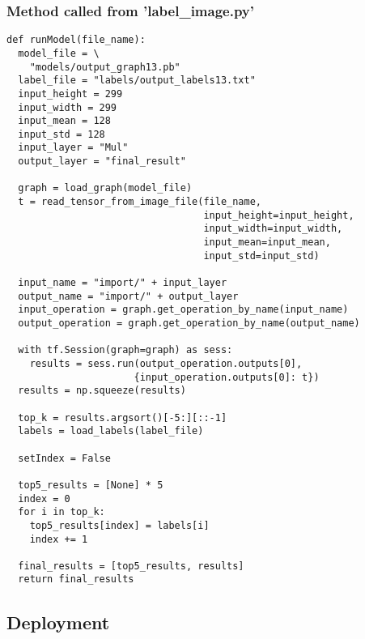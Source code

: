 \subsubsection*{Method called from 'label\_image.py'}
\begin{lstlisting}[style=Python]
def runModel(file_name):
  model_file = \
    "models/output_graph13.pb"
  label_file = "labels/output_labels13.txt"
  input_height = 299
  input_width = 299
  input_mean = 128
  input_std = 128
  input_layer = "Mul"
  output_layer = "final_result"

  graph = load_graph(model_file)
  t = read_tensor_from_image_file(file_name,
                                  input_height=input_height,
                                  input_width=input_width,
                                  input_mean=input_mean,
                                  input_std=input_std)

  input_name = "import/" + input_layer
  output_name = "import/" + output_layer
  input_operation = graph.get_operation_by_name(input_name)
  output_operation = graph.get_operation_by_name(output_name)

  with tf.Session(graph=graph) as sess:
    results = sess.run(output_operation.outputs[0],
                      {input_operation.outputs[0]: t})
  results = np.squeeze(results)

  top_k = results.argsort()[-5:][::-1]
  labels = load_labels(label_file)

  setIndex = False

  top5_results = [None] * 5
  index = 0
  for i in top_k:
    top5_results[index] = labels[i]
    index += 1

  final_results = [top5_results, results]
  return final_results
\end{lstlisting}

\subsection*{Deployment}